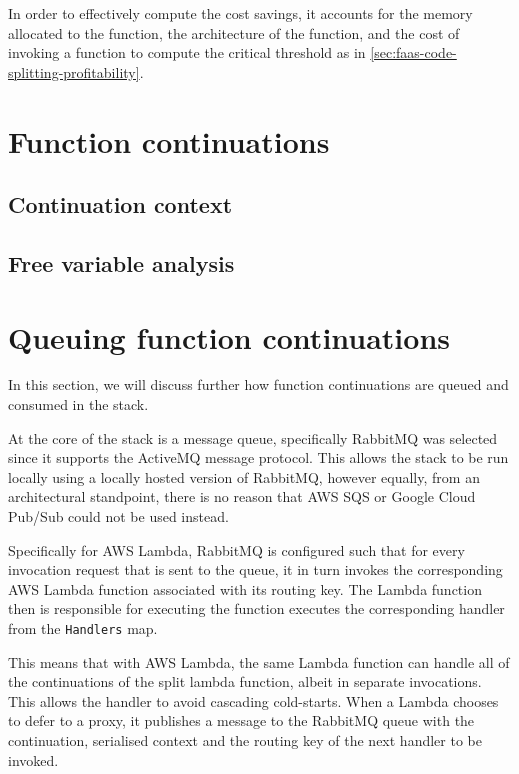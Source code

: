 In order to effectively compute the cost savings, it accounts for the memory allocated to the function, the architecture of the function, and the cost of invoking a function to compute the critical threshold as in \ref{sec:faas-code-splitting-profitability}.

\section{Function continuations}

\subsection{Continuation context}

\subsection{Free variable analysis}

\section{Queuing function continuations}
In this section, we will discuss further how function continuations are queued and consumed in the \faaas{} stack.

At the core of the \faaas{} stack is a message queue, specifically RabbitMQ was selected since it supports the ActiveMQ message protocol. This allows the \faaas{} stack to be run locally using a locally hosted version of RabbitMQ, however equally, from an architectural standpoint, there is no reason that AWS SQS or Google Cloud Pub/Sub could not be used instead.

Specifically for AWS Lambda, RabbitMQ is configured such that for every invocation request that is sent to the queue, it in turn invokes the corresponding AWS Lambda function associated with its routing key. The Lambda function then is responsible for executing the function executes the corresponding handler from the \verb|Handlers| map.

This means that with AWS Lambda, the same Lambda function can handle all of the continuations of the split lambda function, albeit in separate invocations. This allows the handler to avoid cascading cold-starts. When a Lambda chooses to defer to a proxy, it publishes a message to the RabbitMQ queue with the continuation, serialised context and the routing key of the next handler to be invoked.

